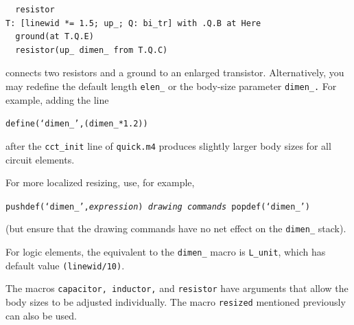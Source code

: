 \begin{verbatim}
  resistor
T: [linewid *= 1.5; up_; Q: bi_tr] with .Q.B at Here
  ground(at T.Q.E)
  resistor(up_ dimen_ from T.Q.C)
\end{verbatim}

\noindent%
connects two resistors and a ground to an enlarged transistor.
Alternatively, you may redefine the default length {\tt elen\_}
or the body-size parameter {\tt dimen\_.}  For example, adding the line

{\tt define(`dimen\_',(dimen\_*1.2))}

\noindent%
after the {\tt cct\_init} line of {\tt quick.m4} produces slightly
larger body sizes for all circuit elements.

For more localized resizing, use, for example,
\par
{\tt pushdef(`dimen\_',{\sl expression}) {\sl drawing commands}
 popdef(`dimen\_')}
\par
\noindent
(but ensure that the drawing commands have no net effect on the {\tt dimen\_}
stack).

For logic elements, the
equivalent to the {\tt dimen\_} macro is {\tt L\_unit}, which has
default value {\tt (linewid/10)}.

The macros {\tt capacitor, inductor,} and {\tt resistor} have arguments
that allow the body sizes to be adjusted individually.  The macro
{\tt resized} mentioned previously can also be used.

